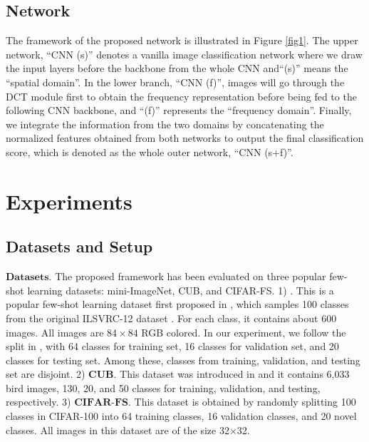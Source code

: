 \documentclass[10pt, conference, compsocconf]{IEEEtran}
\begin{document}
\subsection{Network}

The framework of the proposed network is illustrated in Figure \ref{fig1}. The upper network, \enquote{CNN (s)} denotes a vanilla image classification network where we draw the input layers before the backbone from the whole CNN and\enquote{(s)} means the \enquote{spatial domain}. In the lower branch, \enquote{CNN (f)}, images will go through the DCT module first to obtain the frequency representation before being fed to the following CNN backbone, and \enquote{(f)} represents the \enquote{frequency domain}. Finally, we integrate the information from the two domains by concatenating the {}{normalized} features obtained from both networks to output the final classification score, which is denoted as the whole outer network, \enquote{CNN (s+f)}. 

\section{Experiments}

\subsection{Datasets and Setup} 

$\textbf{Datasets.}$  The proposed framework has been evaluated on three popular few-shot learning datasets: mini-ImageNet, CUB, and CIFAR-FS.  1) . This is a popular few-shot learning dataset first proposed in  \cite{vinyals2016matching}, which samples 100 classes from the original ILSVRC-12 dataset \cite{russakovsky2015imagenet}.  For each class, it contains about 600 images. All images are $84\times 84$ RGB colored. In our experiment, we follow the split in  \cite{ravi2016optimization}, with 64 classes for training set, 16 classes for validation set, and 20 classes for testing set. Among these, classes from training, validation, and testing set are disjoint.  2) \noindent $\textbf{CUB}$. This dataset was introduced in  \cite{welinder2010caltech} and it contains 6,033 bird images, 130, 20, and 50 classes for training, validation, and testing, respectively. 3) \noindent $\textbf{CIFAR-FS}$. This dataset \cite{bertinetto2018meta} is obtained by randomly splitting 100 classes in CIFAR-100 \cite{krizhevsky2009learning} into 64 training classes, 16 validation classes, and 20 novel classes. All images in this dataset are of the size 32$\times$32.
\end{document}
